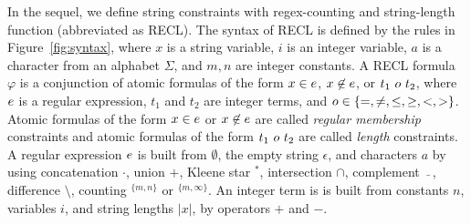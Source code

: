 %

In the sequel, we define string constraints with regex-counting and string-length function (abbreviated as RECL). The syntax of RECL is defined by the rules in Figure~\ref{fig:syntax}, where $x$ is a string variable, $i$ is an integer variable, $a$ is a character from an alphabet $\Sigma$, and $m, n$ are integer constants. 
A RECL formula $\varphi$ is a conjunction of atomic formulas of the form $x \in e$, $x \not \in e$, or $t_1\ \op\ t_2$, where $e$ is a regular expression,  
$t_1$ and $t_2$ are integer terms, and $o \in \{=, \neq, \le, \ge, <, >\}$. Atomic formulas of the form $x \in e$ or $x \not \in e$ are called \emph{regular membership} constraints and atomic formulas of the form $t_1\ \op\ t_2$ are called \emph{length} constraints. 
%
A regular expression $e$ is built from $\emptyset$, the empty string $\epsilon$, and characters $a$ by using concatenation  $\cdot$, union $+$, Kleene star $^*$, intersection $\cap$, complement $\bar{\mbox{ }}$, difference $\setminus$, counting $^{\{m,n\}}$ or $^{\{m,\infty\}}$. An integer term is is built from constants $n$, variables $i$, and string lengths $|x|$, by operators $+$ and $-$.
% 
